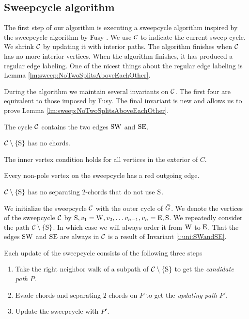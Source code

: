 
\subsection{Sweepcycle algorithm}
\thispagestyle{plain}
\label{ss:sweep}
The first step of our algorithm is executing a sweepcycle algorithm inspired by the sweepcycle algorithm by Fusy \cite{Fusy2006}. We use $\mathcal{C}$ to indicate the current sweep cycle. We shrink $\mathcal{C}$ by updating it with interior paths.
The algorithm finishes when $\mathcal{C}$ has no more interior vertices. When the algorithm finishes, it has produced a regular edge labeling.
One of the nicest things about the regular edge labeling is Lemma \ref{lm:sweep:NoTwoSplitsAboveEachOther}.

During the algorithm we maintain several invariants on $\mathcal{C}$. The first four are equivalent to those imposed by Fusy. The final invariant is new and allows us to prove Lemma \ref{lm:sweep:NoTwoSplitsAboveEachOther}.

\begin{invariants}
  \itemsep=-4pt
  \item \label{i:uni:SWandSE} The cycle $\mathcal{C}$ contains the two edges $\mathrm{S} \mathrm{W}$ and $\mathrm{S} \mathrm{E}$.
  \item \label{i:uni:noChords} $\mathcal{C} \setminus \left\lbrace {\mathrm{S}} \right\rbrace$ has no chords.
  \item \label{i:uni:intVertCond} The inner vertex condition holds for all vertices in the exterior of $C$.
  \item \label{i:uni:redOutgoing} Every non-pole vertex on the sweepcycle has a red outgoing edge.
  \item \label{i:uni:no2Chords} $\mathcal{C}\setminus \left\lbrace {\mathrm{S}} \right\rbrace$ has no separating 2-chords that do not use $\mathrm{S}$.
\end{invariants}

We initialize the sweepcycle $\mathcal{C}$ with the outer cycle of $\bar{G}$.
We denote the vertices of the sweepcycle $\mathcal{C}$ by $\mathrm{S}, v_1 = \mathrm{W}, v_2, \ldots v_{n-1}, v_n = \mathrm{E}, \mathrm{S}$.
We repeatedly consider the path $\mathcal{C} \setminus \left\lbrace {\mathrm{S}} \right\rbrace$.
In which case we will always order it from $\mathrm{W}$ to $\mathrm{E}$. That the edges $\mathrm{S} \mathrm{W}$ and $\mathrm{S} \mathrm{E}$ are always in $\mathcal{C}$ is a result of Invariant \ref{i:uni:SWandSE}.


Each update of the sweepcycle consists of the following three steps
\begin{enumerate}
  \itemsep=-4pt
  \item Take the right neighbor walk of a subpath of $\mathcal{C} \setminus \left\lbrace {\mathrm{S}} \right\rbrace$ to get the \emph{candidate path} $P$.
  \item Evade chords and separating $2$-chords on $P$ to get the \emph{updating path} $P'$.
  \item Update the sweepcycle with $P'$.
\end{enumerate}

